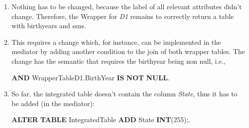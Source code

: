 \documentclass{scrartcl}
\begin{document}
\begin{enumerate}
		\item Nothing has to be changed, because the label of all relevant attributes didn't change.
		Therefore, the Wrapper for \textit{D1} remains to correctly return a table with birthyears and ssns.
		
		\item This requires a change which, for instance, can be implemented in the mediator by adding another condition to the join of both wrapper tables.
		The change has the semantic that requires the birthyear being non null, i.e.,
		\begin{center}
			\textbf{AND} WrapperTableD1.BirthYear \textbf{IS} \textbf{NOT} \textbf{NULL}.
		\end{center}
		
		\item So far, the integrated table doesn't contain the column \textit{State}, thus it has to be added (in the mediator):
		\begin{center}
			\textbf{ALTER} \textbf{TABLE} IntegratedTable \textbf{ADD} State \textbf{INT}(255);.
		\end{center}
	\end{enumerate}
	
\end{document}
